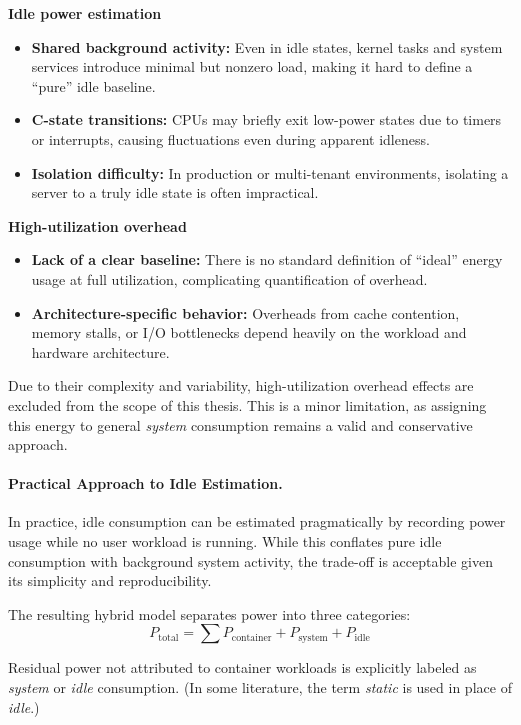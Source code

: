 \textbf{Idle power estimation}
\begin{itemize}
    \item \textbf{Shared background activity:} Even in idle states, kernel tasks and system services introduce minimal but nonzero load, making it hard to define a “pure” idle baseline.
    \item \textbf{C-state transitions:} CPUs may briefly exit low-power states due to timers or interrupts, causing fluctuations even during apparent idleness.
    \item \textbf{Isolation difficulty:} In production or multi-tenant environments, isolating a server to a truly idle state is often impractical.
\end{itemize}

\textbf{High-utilization overhead}
\begin{itemize}
    \item \textbf{Lack of a clear baseline:} There is no standard definition of “ideal” energy usage at full utilization, complicating quantification of overhead.
    \item \textbf{Architecture-specific behavior:} Overheads from cache contention, memory stalls, or I/O bottlenecks depend heavily on the workload and hardware architecture.
\end{itemize}

Due to their complexity and variability, high-utilization overhead effects are excluded from the scope of this thesis. This is a minor limitation, as assigning this energy to general \textit{system} consumption remains a valid and conservative approach.

\paragraph{Practical Approach to Idle Estimation.} 
In practice, idle consumption can be estimated pragmatically by recording power usage while no user workload is running. While this conflates pure idle consumption with background system activity, the trade-off is acceptable given its simplicity and reproducibility.

The resulting hybrid model separates power into three categories:
\begin{equation}
    P_\text{total} = \sum P_\text{container} + P_\text{system} + P_\text{idle}
\end{equation}

Residual power not attributed to container workloads is explicitly labeled as \textit{system} or \textit{idle} consumption. (In some literature, the term \textit{static} is used in place of \textit{idle}.)

